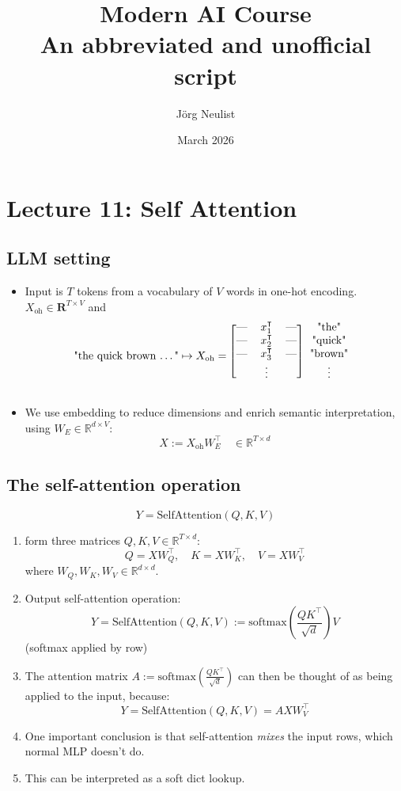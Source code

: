 \documentclass{article}
\title{
  Modern AI Course \\
  \large An abbreviated and unofficial script}
\author{Jörg Neulist}
\date{March 2026}
\begin{document}
\maketitle

\section*{Lecture 11: Self Attention}
\subsection*{LLM setting}
\begin{itemize}
    \item Input is $T$ tokens from a vocabulary of $V$ words in one-hot encoding. $X_\mathrm{oh}\in\mathbf{R}^{T\times V}$ and
    $$\text{"the quick brown \dots"} \mapsto X_\mathrm{oh} = 
    \begin{blockarray}{[ccc]c}
        \text{---} & x_1^\intercal & \text{---} & \text{"the"}\\
        \text{---} & x_2^\intercal & \text{---} & \text{"quick"}\\
        \text{---} & x_3^\intercal & \text{---} & \text{"brown"}\\
        &\vdots&&\vdots
    \end{blockarray}$$
    
\item We use embedding to reduce dimensions and enrich semantic interpretation, using $W_E\in\mathbb{R}^{d\times V}$:\\
    $$X := X_\mathrm{oh} W_E^\intercal\quad\in\mathbb{R}^{T\times d}$$
\end{itemize}

\subsection*{The self-attention operation}
$$Y = \mathrm{SelfAttention}(Q, K, V)$$
\begin{enumerate}
    \item form three matrices $Q, K, V\in\mathbb{R}^{T\times d}$:
    $$Q = X W_Q^\intercal,\quad K = X W_K^\intercal,\quad V = X W_V^\intercal$$
    where $W_Q, W_K, W_V\in\mathbb{R}^{d\times d}$.

    \item Output self-attention operation:
    $$Y = \mathrm{SelfAttention}(Q, K, V) := \mathrm{softmax}\left(\frac{QK^\intercal}{\sqrt{d}}\right)V$$
    (softmax applied by row)

    \item The attention matrix $A := \mathrm{softmax}\left(\frac{QK^\intercal}{\sqrt{d}}\right)$ can then be thought of as being applied to the input, because:
    $$Y = \mathrm{SelfAttention}(Q, K, V) = A X W_V^\intercal $$

    \item One important conclusion is that self-attention \emph{mixes} the input rows, which normal MLP doesn't do.

    \item This can be interpreted as a soft dict lookup.
\end{enumerate}
\end{document}
